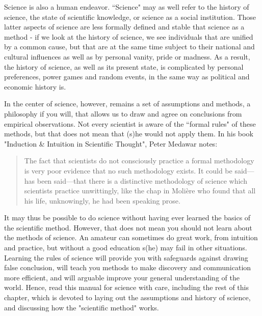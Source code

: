 \documentclass{tufte-book}
\begin{document}
Science is also a human endeavor. ``Science" may as well refer to the history of science, the state of scientific knowledge, or science as a social institution. Those latter aspects of science are less formally defined and stable that science as a method - if we look at the history of science, we see individuals that are unified by a common cause, but that are at the same time subject to their national and cultural influences as well as by personal vanity, pride or madness. As a result, the history of science, as well as its present state, is complicated by personal preferences, power games and random events, in the same way as political and economic history is. 

In the center of science, however, remains a set of assumptions and methods, a philosophy if you will, that allows us to draw and agree on conclusions from empirical observations. Not every scientist is aware of the ``formal rules" of these methods, but that does not mean that (s)he would not apply them. In his book "Induction \& Intuition in Scientific Thought", Peter Medawar notes: 

\begin{quote}
The fact that scientists do not consciously practice a formal methodology is very poor evidence that no such methodology exists. It could be said—has been said—that there is a distinctive methodology of science which scientists practice unwittingly, like the chap in Molière who found that all his life, unknowingly, he had been speaking prose.
\end{quote}

It may thus be possible to do science without having ever learned the basics of the scientific method. However, that does not mean you should not learn about the methods of science. An amateur can sometimes do great work, from intuition and practice, but without a good education s(he) may fail in other situations. Learning the rules of science will provide you with safeguards against drawing false conclusion, will teach you methods to make discovery and communication more efficient, and will arguable improve your general understanding of the world. Hence, read this manual for science with care, including the  rest of this chapter, which is devoted to laying out the assumptions and history of science, and discussing how the "scientific method" works. 
\end{document}
